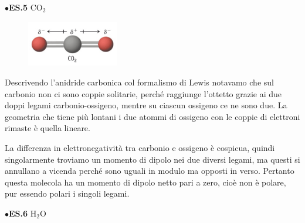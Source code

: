 \vspace{0.2cm}$\bullet$\textbf{ES.5} CO$_2$

\hspace{0.5cm}\begin{minipage}{0.2\textwidth}
    \begin{figure}[H]
    \includegraphics[width=4cm]{immagini/CO_2.png}
    \end{figure}
    \end{minipage} \hfill
    \begin{minipage}{0.65\textwidth}
    \vspace{0.4cm}Descrivendo l'anidride carbonica col formalismo di Lewis notavamo che sul carbonio non ci sono coppie solitarie, perché raggiunge l'ottetto grazie ai due doppi legami carbonio-ossigeno, mentre su ciascun ossigeno ce ne sono due. La geometria che tiene più lontani i due atommi di ossigeno con le coppie di elettroni rimaste è quella lineare.
    
    La differenza in elettronegatività tra carbonio e ossigeno è cospicua, quindi singolarmente troviamo un momento di dipolo nei due diversi legami, ma questi si annullano a vicenda perché sono uguali in modulo ma opposti in verso. Pertanto questa molecola ha un momento di dipolo netto pari a zero, cioè non è polare, pur essendo polari i singoli legami.
    \end{minipage}

\vspace{0.2cm}$\bullet$\textbf{ES.6} H$_2$O


